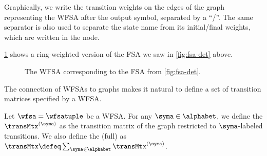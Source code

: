 Graphically, we write the transition weights on the edges of the graph representing the WFSA after the output symbol, separated by a ``/''.
The same separator is also used to separate the state name from its initial/final weights, which are written in the node.
\begin{example}
\cref{fig:weighted-fsa} shows a ring-weighted version of the FSA we saw in \cref{fig:fsa-det} above.
\begin{figure}[ht] 
\centering
    \centering
\caption{The WFSA corresponding to the FSA from \cref{fig:fsa-det}.}
\label{fig:weighted-fsa}
\end{figure}
    
\end{example}

The connection of WFSAs to graphs makes it natural to define a set of transition matrices specified by a WFSA.
\begin{definition}
    Let $\wfsa = \wfsatuple$ be a WFSA.
    For any $\syma \in \alphabet$, we define the  $\transMtx^{\left(\syma\right)}$ as the transition matrix of the graph restricted to $\syma$-labeled transitions.
    We also define the (full)  as $\transMtx \defeq \sum_{\syma \in \alphabet}\transMtx^{\left(\syma\right)}$.
\end{definition}

